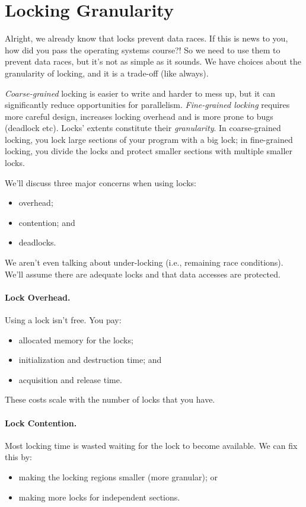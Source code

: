 \section*{Locking Granularity}

Alright, we already know that locks prevent data races. If this is news to you, how did you pass the operating systems course?! So we need to use them to prevent data races, but it's not as simple as it sounds. We have choices about the granularity of locking, and it is a trade-off (like always).

\textit{Coarse-grained} locking is easier to write and harder to mess up, but it can significantly reduce opportunities for parallelism. \textit{
Fine-grained locking} requires more careful design,
increases locking overhead and is more prone to bugs (deadlock etc).  
Locks' extents constitute their {\it granularity}. In coarse-grained locking, you
lock large sections of your program with a big lock; in fine-grained
locking, you divide the locks and protect smaller sections with multiple smaller locks.

We'll discuss three major concerns when using locks:
  \begin{itemize}
    \item overhead;
    \item contention; and
    \item deadlocks.
  \end{itemize}
We aren't even talking about under-locking (i.e., remaining race conditions). We'll assume there are adequate locks and that data accesses are protected. 

\paragraph{Lock Overhead.}
  Using a lock isn't free. You pay:
  \begin{itemize}
    \item allocated memory for the locks;
    \item initialization and destruction time; and
    \item acquisition and release time.
  \end{itemize}
  These costs scale with the number of locks that you have.

\paragraph{Lock Contention.}
 Most locking time is wasted waiting for the lock to become available.
We can fix this by:
      \begin{itemize}
        \item making the locking regions smaller (more granular); or
        \item making more locks for independent sections.
      \end{itemize}


